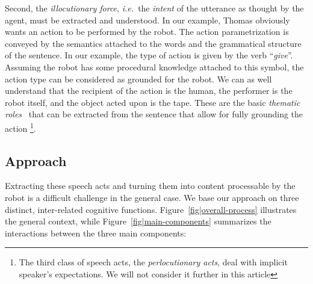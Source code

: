 \documentclass[twocolumn]{svjour3}
\newcommand{\ie}{{\textit{i.e.~}}}
\begin{document}
Second, the \emph{illocutionary force}, \ie the \emph{intent} of the utterance
as thought by the agent, must be extracted and understood. In our example,
Thomas obviously wants an action to be performed by the robot. The action
parametrization is conveyed by the semantics attached to the words and the
grammatical structure of the sentence. In our example, the type of action is
given by the verb ``\textit{give}''. Assuming the robot has some procedural
knowledge attached to this symbol, the action type can be considered as
grounded for the robot. We can as well understand that the recipient of the
action is the human, the performer is the robot itself, and the object acted
upon is the tape. These are the basic \emph{thematic roles}~\cite{Gruber1965}
that can be extracted from the sentence that allow for fully grounding the action
\footnote{The third class of speech acts, the \emph{perlocutionary acts}, deal
with implicit speaker's expectations. We will not consider it further in this
article}.


\subsection{Approach}

Extracting these speech acts and turning them into content processable by the
robot is a difficult challenge in the general case. We base our approach on
three distinct, inter-related cognitive functions.
Figure~\ref{fig|overall-process} illustrates the general context, while
Figure~\ref{fig|main-components} summarizes the interactions between the three
main components:
\end{document}
